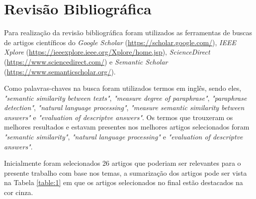 \chapter{Revisão Bibliográfica}

Para realização da revisão bibliográfica foram utilizados as ferramentas de buscas de artigos científicos do \textit{Google Scholar} (\url{https://scholar.google.com/}), \textit{IEEE Xplore} (\url{https://ieeexplore.ieee.org/Xplore/home.jsp}), \textit{ScienceDirect} (\url{https://www.sciencedirect.com/}) e \textit{Semantic Scholar} (\url{https://www.semanticscholar.org/}).

Como palavras-chaves na busca foram utilizados termos em inglês, sendo eles, \textit{"semantic similarity between texts"}, \textit{"measure degree of paraphrase"}, \textit{"paraphrase detection"}, \textit{"natural language processing"}, \textit{"measure semantic similarity between answers"} e \textit{"evaluation of descriptve answers"}. Os termos que trouxeram os melhores resultados e estavam presentes nos melhores artigos selecionados foram \textit{"semantic similarity"}, \textit{"natural language processing"} e \textit{"evaluation of descriptve answers"}.

Inicialmente foram selecionados 26 artigos que poderiam ser relevantes para o presente trabalho com base nos temas, a sumarização dos artigos pode ser vista na Tabela \ref{table:1} em que os artigos selecionados no final estão destacados na cor cinza.

